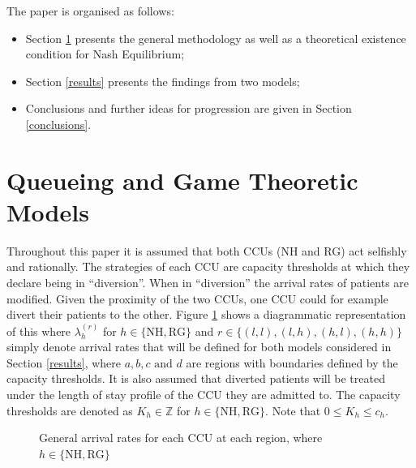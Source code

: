\documentclass{article}
\newcommand{\NH}{\text{NH}}
\newcommand{\RG}{\text{RG}}
\begin{document}
The paper is organised as follows:
\begin{itemize}
    \item Section \ref{queueingandgamemodels} presents the general methodology as well as a theoretical existence condition for Nash Equilibrium;
    \item Section \ref{results} presents the findings from two models;
    \item Conclusions and further ideas for progression are given in Section \ref{conclusions}.
\end{itemize}

\section{Queueing and Game Theoretic Models} \label{queueingandgamemodels}

Throughout this paper it is assumed that both CCUs (NH and RG) act selfishly and rationally.
The strategies of each CCU are capacity thresholds at which they declare being in ``diversion''. When in ``diversion'' the arrival rates of patients are modified.
Given the proximity of the two CCUs, one CCU could for example divert their patients to the other.
Figure \ref{arrivalrateregions} shows a diagrammatic representation of this where $\lambda_h^{(r)}$ for $h\in\{\NH, \RG\}$ and $r\in\{(l,l), (l,h), (h,l), (h,h)\}$ simply denote arrival rates that will be defined for both models considered in Section \ref{results}, where $a,b,c \text{ and } d$ are regions with boundaries defined by the capacity thresholds.
It is also assumed that diverted patients will be treated under the length of stay profile of the CCU they are admitted to.
The capacity thresholds are denoted as $K_{h}\in\mathbb{Z}$ for $h\in\{\NH,\RG\}$. Note that $0\leq K_h\leq c_h$.

\begin{figure}[!htbp]
\begin{center}
\caption{General arrival rates for each CCU at each region, where $h\in\{\NH, \RG\}$} \label{arrivalrateregions}
\end{center}
\end{figure}
\end{document}
